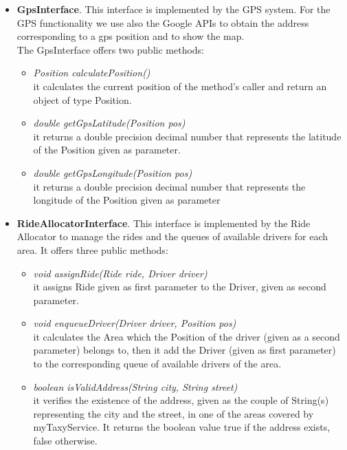 \documentclass[\mainpath/main]{subfiles}
\begin{document}
\begin{itemize}
	
	\item \textbf{GpsInterface}. This interface is implemented by the GPS system. For the GPS functionality we use also the Google APIs to obtain the address corresponding to a gps position and to show the map.\\
	The GpsInterface offers two public methods:
	\begin{itemize}
		\item \textit{Position calculatePosition()}\\
		it calculates the current position of the method's caller and return an object of type Position.
		\item \textit{double getGpsLatitude(Position pos)}\\
		it returns a double precision decimal number that represents the latitude of the Position given as parameter.
	\end{itemize}
	\begin{itemize}
		\item \textit{double getGpsLongitude(Position pos)}\\
		it returns a double precision decimal number that represents the longitude of the Position given as parameter
	\end{itemize}
	
	\item \textbf{RideAllocatorInterface}. This interface is implemented by the Ride Allocator to manage the rides and the queues of available drivers for each area. It offers three public methods:
	\begin{itemize}
		\item \textit{void assignRide(Ride ride, Driver driver)}\\
		it assigns Ride given as first parameter to the Driver, given as second parameter.
		\item \textit{void enqueueDriver(Driver driver, Position pos)}\\
		it calculates the Area which the Position of the driver (given as a second parameter) belongs to, then it add the Driver (given as first parameter) to the corresponding queue of available drivers of the area.
		\item \textit{boolean isValidAddress(String city, String street)}\\
		it verifies the existence of the address, given as the couple of String(s) representing the city and the street, in one of the areas covered by myTaxyService. It returns the boolean value true if the address exists, false otherwise.
	\end{itemize}	
	

\end{itemize}
\end{document}
